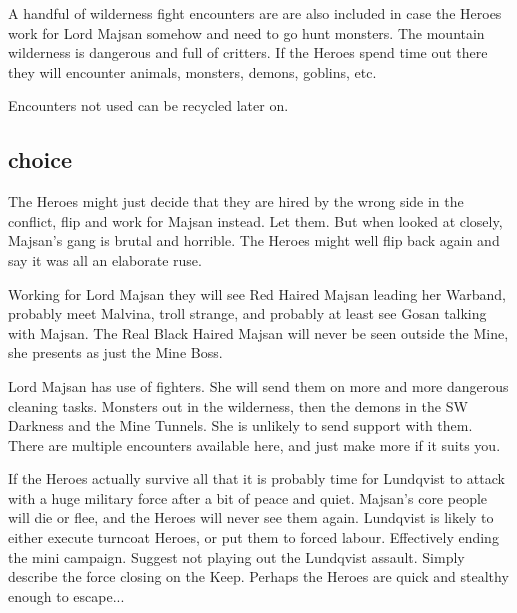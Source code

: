 A handful of wilderness fight encounters are are also included in case the Heroes work for Lord Majsan somehow and need to go hunt monsters. The mountain wilderness is dangerous and full of critters. If the Heroes spend time out there they will encounter animals, monsters, demons, goblins, etc.

Encounters not used can be recycled later on.


\subsection*{choice}
The Heroes might just decide that they are hired by the wrong side in the conflict, flip and work for Majsan instead. Let them. But when looked at closely, Majsan's gang is brutal and horrible. The Heroes might well flip back again and say it was all an elaborate ruse.

Working for Lord Majsan they will see Red Haired Majsan leading her Warband, probably meet Malvina, troll strange, and probably at least see Gosan talking with Majsan. The Real Black Haired Majsan will never be seen outside the Mine, she presents as just the Mine Boss.

Lord Majsan has use of fighters. She will send them on more and more dangerous cleaning tasks. Monsters out in the wilderness, then the demons in the SW Darkness and the Mine Tunnels. She is unlikely to send support with them.
There are multiple encounters available here, and just make more if it suits you.

If the Heroes actually survive all that it is probably time for Lundqvist to attack with a huge military force after a bit of peace and quiet. Majsan's core people will die or flee, and the Heroes will never see them again. Lundqvist is likely to either execute turncoat Heroes, or put them to forced labour. Effectively ending the mini campaign. Suggest not playing out the Lundqvist assault. Simply describe the force closing on the Keep. Perhaps the Heroes are quick and stealthy enough to escape...







